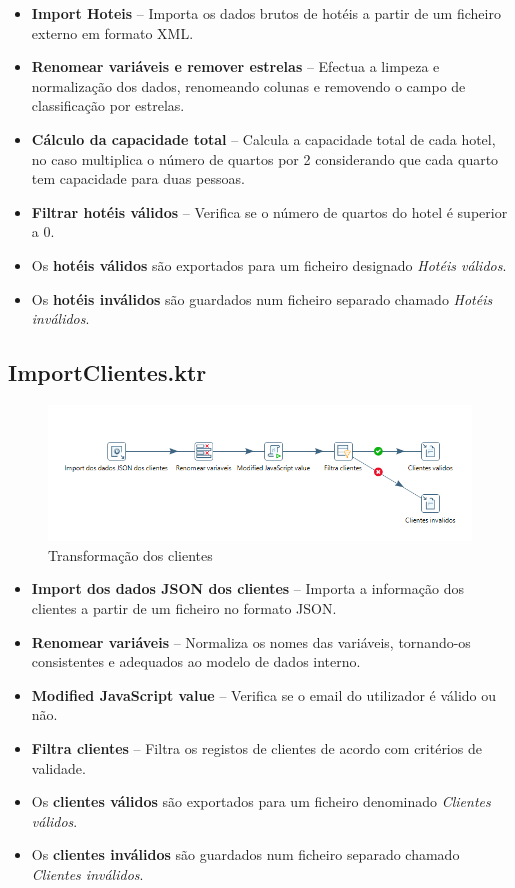 \documentclass[a4paper, 12pt]{article} %
\begin{document}
\begin{itemize}
	\item \textbf{Import Hoteis} – Importa os dados brutos de hotéis a partir de um ficheiro externo em formato XML.
	\item \textbf{Renomear variáveis e remover estrelas} – Efectua a limpeza e normalização dos dados, renomeando colunas e removendo o campo de classificação por estrelas.
	\item \textbf{Cálculo da capacidade total} – Calcula a capacidade total de cada hotel, no caso multiplica o número de quartos por 2 considerando que cada quarto tem capacidade para duas pessoas.
	\item \textbf{Filtrar hotéis válidos} – Verifica se o número de quartos do hotel é superior a 0.
	\item Os \textbf{hotéis válidos} são exportados para um ficheiro designado \textit{Hotéis válidos}.
	\item Os \textbf{hotéis inválidos} são guardados num ficheiro separado chamado \textit{Hotéis inválidos}.
\end{itemize}

\subsection{ImportClientes.ktr}

\begin{figure}[h] 
	\centering 
	\includegraphics[width=1\textwidth]{images/clientes.png}
	\caption{Transformação dos clientes}
	\label{fig:transformacao_clientes}
\end{figure}


\begin{itemize}
	\item \textbf{Import dos dados JSON dos clientes} – Importa a informação dos clientes a partir de um ficheiro no formato JSON.
	\item \textbf{Renomear variáveis} – Normaliza os nomes das variáveis, tornando-os consistentes e adequados ao modelo de dados interno.
	\item \textbf{Modified JavaScript value} – Verifica se o email do utilizador é válido ou não.
	\item \textbf{Filtra clientes} – Filtra os registos de clientes de acordo com critérios de validade.
	\item Os \textbf{clientes válidos} são exportados para um ficheiro denominado \textit{Clientes válidos}.
	\item Os \textbf{clientes inválidos} são guardados num ficheiro separado chamado \textit{Clientes inválidos}.
\end{itemize}
\end{document}
